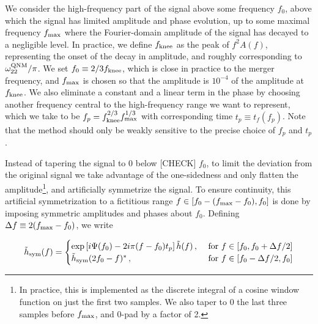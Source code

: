 \documentclass[aps,showpacs,twocolumn,
prd,superscriptaddress,nofootinbib]{revtex4-1}
\newcommand{\be}{\begin{equation}}
\newcommand{\ee}{\end{equation}}
\newcommand{\tf}{t_{f}}
\newcommand{\jgb}[1]{{\color{DarkGreen} #1}}
\begin{document}
We consider the high-frequency part of the signal above some frequency $f_{0}$, above which the signal has limited amplitude and phase evolution, up to some maximal frequency $f_{\rm max}$ where the Fourier-domain amplitude of the signal has decayed to a negligible level. In practice, we define $f_{\rm knee}$ as the peak of $f^{2}A(f)$, representing the onset of the decay in amplitude, and roughly corresponding to $\omega_{22}^{\rm QNM}/\pi$. We set $f_{0}\equiv 2/3f_{\rm knee}$, which is close in practice to the merger frequency, and $f_{\rm max}$ is chosen so that the amplitude is $10^{-4}$ of the amplitude at $f_{\rm knee}$. We also eliminate a constant and a linear term in the phase by choosing another frequency central to the high-frequency range we want to represent, which we take to be $f_{p} = f_{\rm knee}^{2/3} f_{\rm max}^{1/3}$ with corresponding time $t_{p}\equiv \tf(f_{p})$. Note that the method should only be weakly sensitive to the precise choice of $f_{p}$ and $t_{p}$.

Instead of tapering the signal to $0$ \jgb{below [CHECK]} $f_{0}$, to limit the deviation from the original signal we take advantage of the one-sidedness and only flatten the amplitude\footnote{In practice, this is implemented as the discrete integral of a cosine window function on just the first two samples. We also taper to 0 the last three samples before $f_{\rm max}$, and $0$-pad by a factor of 2.}, and artificially symmetrize the signal. To ensure continuity, this artificial symmetrization to a fictitious range $f\in [f_{0} - (f_{\rm max} - f_{0}), f_{0}]$ is done by imposing symmetric amplitudes and phases about $f_{0}$. Defining $\Delta f \equiv 2 (f_{\rm max} - f_{0})$, we write
\begin{widetext}
\be\label{eq:defhsym}
	\tilde{h}_{\rm sym}(f) = 
	\begin{cases} 
		\exp\left[i \Psi(f_{0}) - 2i\pi (f-f_{0}) t_{p} \right] \tilde{h}(f) \,,  &\text{ for } f \in [f_{0}, f_{0} + \Delta f /2] \\
	\tilde{h}_{\rm sym}(2 f_{0} - f)^{*} \,,  &\text{ for } f \in [f_{0} - \Delta f/2, f_{0}]
	\end{cases}
\ee
\end{widetext}
\end{document}
